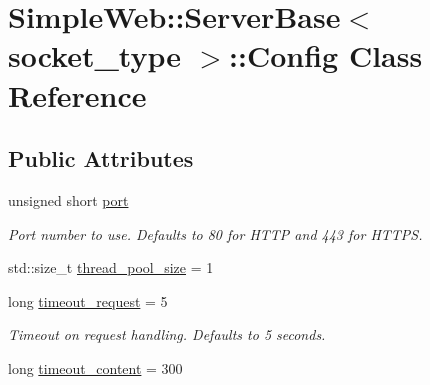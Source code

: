 \hypertarget{classSimpleWeb_1_1ServerBase_1_1Config}{}\section{Simple\+Web\+:\+:Server\+Base$<$ socket\+\_\+type $>$\+:\+:Config Class Reference}
\label{classSimpleWeb_1_1ServerBase_1_1Config}
\subsection*{Public Attributes}
\begin{DoxyCompactItemize}
\item 
unsigned short \hyperlink{classSimpleWeb_1_1ServerBase_1_1Config_aa80030952ff056db08f736d5537bd2c9}{port}\hypertarget{classSimpleWeb_1_1ServerBase_1_1Config_aa80030952ff056db08f736d5537bd2c9}{}\label{classSimpleWeb_1_1ServerBase_1_1Config_aa80030952ff056db08f736d5537bd2c9}

\begin{DoxyCompactList}\small\item\em Port number to use. Defaults to 80 for H\+T\+TP and 443 for H\+T\+T\+PS. \end{DoxyCompactList}\item 
std\+::size\+\_\+t \hyperlink{classSimpleWeb_1_1ServerBase_1_1Config_a31ed6db903e42d6e2748d195de7b956b}{thread\+\_\+pool\+\_\+size} = 1
\item 
long \hyperlink{classSimpleWeb_1_1ServerBase_1_1Config_a2fac6158227cb95a3322c0c5d04b3648}{timeout\+\_\+request} = 5\hypertarget{classSimpleWeb_1_1ServerBase_1_1Config_a2fac6158227cb95a3322c0c5d04b3648}{}\label{classSimpleWeb_1_1ServerBase_1_1Config_a2fac6158227cb95a3322c0c5d04b3648}

\begin{DoxyCompactList}\small\item\em Timeout on request handling. Defaults to 5 seconds. \end{DoxyCompactList}\item 
long \hyperlink{classSimpleWeb_1_1ServerBase_1_1Config_a821a5c9c69f9d04b829b9392a3e89f11}{timeout\+\_\+content} = 300\hypertarget{classSimpleWeb_1_1ServerBase_1_1Config_a821a5c9c69f9d04b829b9392a3e89f11}{}\label{classSimpleWeb_1_1ServerBase_1_1Config_a821a5c9c69f9d04b829b9392a3e89f11}


\end{DoxyCompactItemize}
